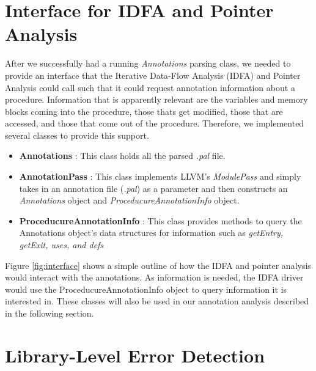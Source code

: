 \section{Interface for IDFA and Pointer Analysis}

After we successfully had a running \textit{Annotations} parsing class, we needed to provide an interface that the Iterative Data-Flow Analysis (IDFA) and Pointer Analysis could call such that it could request annotation information about a procedure. Information that is apparently relevant are the variables and memory blocks coming into the procedure, those thats get modified, those that are accessed, and those that come out of the procedure. Therefore, we implemented several classes to provide this support. 

\begin{itemize}
\item {\bf Annotations} : This class holds all the parsed \textit{.pal} file.
\item {\bf AnnotationPass} : This class implements LLVM's \textit{ModulePass} and simply takes in an annotation file (\textit{.pal}) as a parameter and then constructs an \textit{Annotations} object and \textit{ProceducureAnnotationInfo} object. 
\item {\bf ProceducureAnnotationInfo} : This class provides methods to query the Annotations object's data structures for information such as \textit{getEntry, getExit, uses, and defs}
\end{itemize}

Figure \ref{fig:interface} shows a simple outline of how the IDFA and pointer analysis would interact with the annotations. As information is needed, the IDFA driver would use the ProceducureAnnotationInfo object to query information it is interested in. These classes will also be used in our annotation analysis described in the following section.


\section{Library-Level Error Detection}

